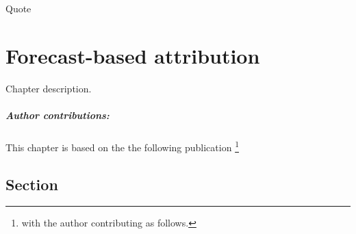 \begin{savequote}[8cm]
    Quote
\end{savequote}
    
\chapter{\label{ch4}Forecast-based attribution} 

Chapter description.
\small\paragraph{Author contributions:} This chapter is based on the the following publication \footnote{with the author contributing as follows.} \par\vspace{1em}

\minitoc

\clearpage

\section{Section}

    \blindtext